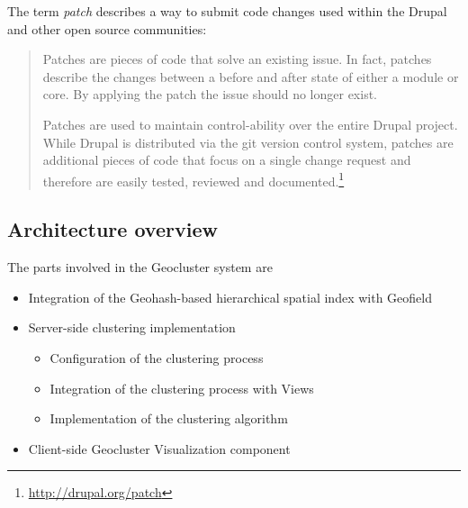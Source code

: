 The term \textit{patch} describes a way to submit code changes used within the Drupal and other open source communities:

\begin{quote}
Patches are pieces of code that solve an existing issue. In fact, patches describe the changes between a before and after state of either a module or core. By applying the patch the issue should no longer exist.

Patches are used to maintain control-ability over the entire Drupal project. While Drupal is distributed via the git version control system, patches are additional pieces of code that focus on a single change request and therefore are easily tested, reviewed and documented.\footnote{\url{http://drupal.org/patch}}
\end{quote}



\subsection{Architecture overview}

The parts involved in the Geocluster system are

\begin{itemize}

\item Integration of the Geohash-based hierarchical spatial index with Geofield

\item Server-side clustering implementation
  \begin{itemize}
   \item Configuration of the clustering process
   \item Integration of the clustering process with Views
   \item Implementation of the clustering algorithm
  \end{itemize}

\item Client-side Geocluster Visualization component

\end{itemize}


